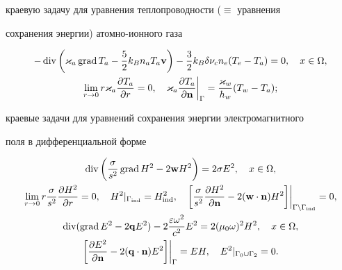 краевую задачу для уравнения теплопроводности ($\equiv$ уравнения


сохранения энергии) атомно-ионного газа


\begin{gather}


-\Div \bigg({\varkappa_{a} \grad T_a - \frac{5}{2} k_B n_{a}T_a


\bold{v}} \bigg) - \frac{3}{2}k_B \delta


\nu_{c}n_{e}(T_{e} - T_a)=0, \quad x \in \Omega, \label{E:k_3_81}\\


%


\lim_{r \to 0} r\varkappa_{a} \frac{\partial T_a}{\partial r}=0, \quad


\varkappa_a \frac{\partial T_{a}}{\partial \bold{n}}


\bigg|_{\Gamma}=\frac{\varkappa_w}{h_w}( T_w-T_a);


\label{E:k_3_82b}


\end{gather}


краевые задачи для уравнений сохранения энергии электромагнитного


поля в дифференциальной форме


\begin{gather}


\Div \bigg( \frac{\sigma}{s^2}\grad H^2 -2\bold{w} H^2 \bigg)


=2\sigma E ^2, \quad x \in \Omega, \label{E:k_3_52}\\


%


\lim_{r \to 0} r\frac{\sigma}{s^2} \frac{\partial H^2}{\partial r}=0, \quad


H^{2}|_{\Gamma_{\ind}}=H^{2}_{\ind}, \quad


\bigg[\frac{\sigma}{s^2}\frac{\partial H^{2}}{\partial \bold{n}} -


2(\bold{w}\cdot \bold{n})H^{2}\bigg]


\bigg|_{\Gamma \setminus \Gamma_{\ind}}=0, \label{E:k_3_54}\\


%


\Div (\grad E^2 - 2\bold{q}E^2) -2 \frac{\varepsilon \omega ^2}{c^2}E^2


=2(\mu_0 \omega) ^2 H^2, \quad x \in \Omega, \label{E:k_3_56}\\


%


\bigg[\frac{\partial E^{2}}{\partial \bold n} - 2


(\bold{q} \cdot \bold{n})E^{2}\bigg]


\bigg|_{\Gamma}=EH, \quad


E^{2}|_{\Gamma_0 \cup \Gamma_{2}}=0.\label{E:k_3_58}


\end{gather}


